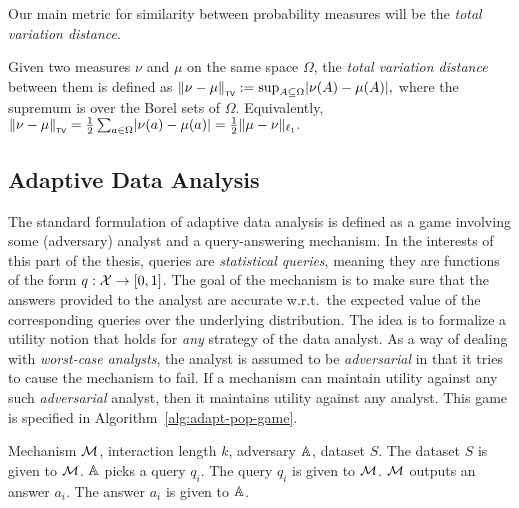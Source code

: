 \documentclass[12pt,a4paper,oneside,onecolumn]{book}
\begin{document}
Our main metric for similarity between probability measures will be the \emph{total variation distance}.

\begin{definition}
  Given two measures $\nu$ and $\mu$ on the same space $\Omega$,
  the {\em total variation distance}
  between them is defined as 
  $\left\lVert\nu - \mu\right\rVert_{\textup{\tiny\textsf{TV}}} := \sup_{A\subseteq \Omega} \lvert\nu(A) - \mu(A)\rvert,$
  where the supremum is over the Borel sets of $\Omega$. Equivalently, $\left\lVert\nu - \mu\right\rVert_{\textup{\tiny\textsf{TV}}} = \frac{1}{2}\sum_{a\in\Omega}\lvert\nu(a) - \mu(a)\rvert = \frac{1}{2}\Vert \mu - \nu \Vert_{\ell_1}.$
\end{definition}

\subsection{Adaptive Data Analysis}
\label{sec:perlim-ada}
The standard formulation of adaptive data analysis is defined as a game
involving some (adversary) analyst and a query-answering mechanism. In the interests of this part of the thesis, queries are {\em statistical queries}, meaning they are functions of the form $q:\mathcal{X}\to [0,1]$.
The goal of the mechanism is to make sure that the answers provided to the analyst are accurate w.r.t.\ the expected value of the corresponding queries over the underlying distribution. The idea is to formalize a utility notion that holds for \emph{any} strategy of the data analyst. As a way of dealing with \emph{worst-case analysts}, the analyst is assumed to be \emph{adversarial} in that it tries to cause the mechanism to fail. If a mechanism can maintain utility against any such \emph{adversarial} analyst, then it maintains utility against any analyst. This game is specified in Algorithm~\ref{alg:adapt-pop-game}.

\begin{algorithm}[tb]
   \caption{$\texttt{Game}(\mechanism,k,\adversary,S)$}
  \label{alg:adapt-pop-game}
\begin{algorithmic}
    Mechanism $\mathcal{M}$, interaction length $k$, adversary $\mathbb{A}$, dataset $S$.
   \State The dataset $S$ is given to $\mathcal{M}$.
   \State $\mathbb{A}$ picks a query $q_i$.
   \State The query $q_i$ is given to $\mathcal{M}$.
   \State $\mathcal{M}$ outputs an answer $a_i$.
   \State The answer $a_i$ is given to $\mathbb{A}$.
   \EndFor
\end{algorithmic}
\end{algorithm}
\end{document}
